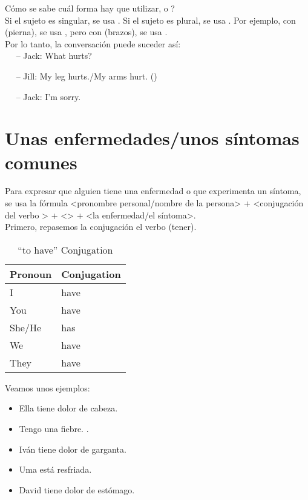 \textquestiondown C\'omo se sabe cu\'al forma hay que utilizar,  o ?\\

Si el sujeto es singular, se usa . Si el sujeto es plural, se usa .
Por ejemplo, con  (pierna), se usa , pero con  (brazos), se usa . \\

Por lo tanto, la conversaci\'on puede suceder as\'i:\\

$\quad$ -- Jack: What hurts?

$\quad$ -- Jill:  My leg hurts./My arms hurt. ()

$\quad$ -- Jack: I'm sorry. \\


\section{Unas enfermedades/unos s\'intomas comunes}

Para expresar que alguien tiene una enfermedad o que experimenta un s\'intoma,
se usa la f\'ormula <pronombre personal/nombre de la persona> +
<conjugaci\'on del verbo > +
<> + <la enfermedad/el s\'intoma>. \\

Primero, repasemos la conjugaci\'on el verbo  (tener).

\begin{table}[H]
	\centering
	\begin{tabular}{ll}
	\toprule
		\textbf{Pronoun} & \textbf{Conjugation} \\
	\midrule
		I & have\\
		You & have \\
		She/He & has \\
		We & have \\
		They & have \\
	\bottomrule
	\end{tabular}
	\caption{``to have'' Conjugation}
\end{table}

Veamos unos ejemplos:

\begin{itemize}
	\item Ella tiene dolor de cabeza.
		\arr {}
	\item Tengo una fiebre.
		\arr {}.
	\item Iv\'an tiene dolor de garganta.
		\arr {}
	\item Uma est\'a resfriada.
		\arr {}
	\item David tiene dolor de est\'omago.
		\arr {}
\end{itemize}

